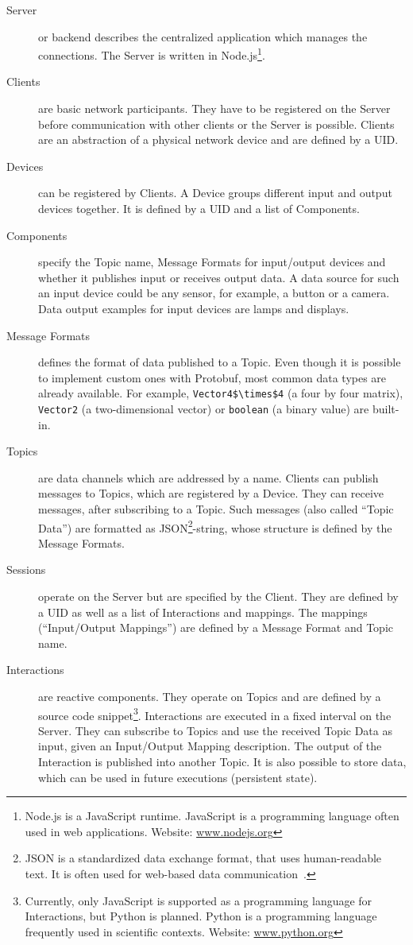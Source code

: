 \begin{description}
	\item[Server] or backend describes the centralized application which manages the connections. The Server is written in Node.js\footnote{Node.js is a JavaScript runtime. JavaScript is a programming language often used in web applications. Website: \href{https://nodejs.org/}{www.nodejs.org}}.
	\item[Clients] are basic network participants. They have to be registered on the Server before communication with other clients or the Server is possible. Clients are an abstraction of a physical network device and are defined by a \gls{UID}.
	\item[Devices] can be registered by Clients. A Device groups different input and output devices together. It is defined by a \gls{UID} and a list of Components. %
	\item[Components] specify the Topic name, Message Formats for input/output devices and whether it publishes input or receives output data. A data source for such an input device could be any sensor, for example, a button or a camera. Data output examples for input devices are lamps and displays.
	\item[Message Formats] defines the format of data published to a Topic. Even though it is possible to implement custom ones with \gls{Protobuf}, most common data types are already available. For example, \lstinline[mathescape=true]{Vector4$\times$4} (a four by four matrix), \lstinline{Vector2} (a two-dimensional vector) or \lstinline{boolean} (a binary value) are built-in. %
	\item[Topics] are data channels which are addressed by a name. Clients can publish messages to Topics, which are registered by a Device. They can receive messages, after subscribing to a Topic. Such messages (also called \enquote{Topic Data}) are formatted as JSON\footnote{JSON is a standardized data exchange format, that uses human-readable text. It is often used for web-based data communication~\cite[iii]{ECMAInternational.2017}.}-string, whose structure is defined by the Message Formats.
	\item[Sessions] operate on the Server but are specified by the Client. They are defined by a \gls{UID} as well as a list of Interactions and mappings. The mappings (\enquote{Input/Output Mappings}) are defined by a Message Format and Topic name.
	\item[Interactions] are reactive components. They operate on Topics and are defined by a source code snippet\footnote{Currently, only JavaScript is supported as a programming language for Interactions, but Python is planned. Python is a programming language frequently used in scientific contexts. Website: \href{https://www.python.org/}{www.python.org}}. Interactions are executed in a fixed interval on the Server. They can subscribe to Topics and use the received Topic Data as input, given an Input/Output Mapping description. The output of the Interaction is published into another Topic. It is also possible to store data, which can be used in future executions (persistent state).

\end{description}
